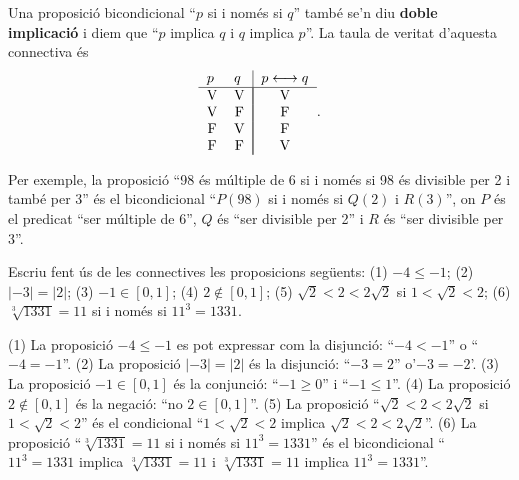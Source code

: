 Una proposició bicondicional \enquote{$p$ si i només si $q$} també se'n
diu \textbf{doble implicació} i diem que \enquote{$p$ implica $q$ i $q$ implica $p$}. La taula de veritat d'aquesta connectiva és\begin{equation*}
\begin{tabular}{ll|l}
$p$ & $q$ & $p\longleftrightarrow q$ \\ \hline
\multicolumn{1}{c}{V} & \multicolumn{1}{c|}{V} & \multicolumn{1}{|c}{V} \\
\multicolumn{1}{c}{V} & \multicolumn{1}{c|}{F} & \multicolumn{1}{|c}{F} \\
\multicolumn{1}{c}{F} & \multicolumn{1}{c|}{V} & \multicolumn{1}{|c}{F} \\
\multicolumn{1}{c}{F} & \multicolumn{1}{c|}{F} & \multicolumn{1}{|c}{V}\end{tabular}
\text{.}
\end{equation*}

Per exemple, la proposició \enquote{98 és múltiple de 6 si i només
si 98 és divisible per 2 i també per 3} és el bicondicional \enquote{$P(98)$ si i només si $Q(2)$ i $R(3)$}, on $P$ és el predicat \enquote{ser múltiple de 6}, $Q$ és \enquote{ser divisible per 2} i $R$ és \enquote{ser divisible
per 3}.

\begin{exemple}
Escriu fent ús de les connectives les proposicions següents: (1) $-4\leq-1$; (2) $\left\vert -3\right\vert =\left\vert 2\right\vert $; (3) $-1\in\left[ 0,1\right] $; (4) $2\notin\left[ 0,1\right] $; (5) $\sqrt {2}<2<2\sqrt{2}$ si $1<\sqrt{2}<2$; (6) $\sqrt[3]{1331}=11$ si i només si $11^{3}=1331$.
\end{exemple}

\begin{solucio}
(1) La proposició $-4\leq-1$ es pot expressar com la disjunció: \enquote{$-4<-1$} o \enquote{$-4=-1$}. (2) La proposició $\left\vert -3\right\vert
=\left\vert 2\right\vert $ és la disjunció: \enquote{$-3=2$} o'$-3=-2$'. (3)
La proposició $-1\in\left[ 0,1\right] $ és la conjunció: \enquote{$-1\geq0$} i \enquote{$-1\leq1$}. (4) La proposició $2\notin\left[ 0,1\right] $
és la negació: \enquote{no $2\in\left[ 0,1\right] $}. (5) La proposició \enquote{$\sqrt{2}<2<2\sqrt{2}$ si $1<\sqrt{2}<2$} és el condicional \enquote{$1<\sqrt {2}<2$ implica $\sqrt{2}<2<2\sqrt{2}$}. (6) La proposició \enquote{$\sqrt[3]{1331}=11$ si i només si $11^{3}=1331$} és el bicondicional \enquote{ $11^{3}=1331$
implica $\sqrt[3]{1331}=11$ i $\sqrt[3]{1331}=11$ implica $11^{3}=1331$}.
\end{solucio}

